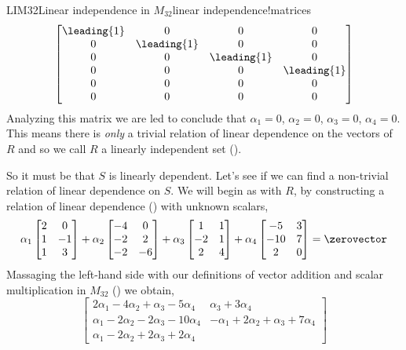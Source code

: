 \begin{example}{LIM32}{Linear independence in $M_{32}$}{linear independence!matrices}
\begin{equation*}
\begin{bmatrix}
\leading{1} & 0 & 0 & 0\\ 
0 & \leading{1} & 0 & 0\\ 
0 & 0 & \leading{1} & 0\\ 
0 & 0 & 0 & \leading{1}\\ 
0 & 0 & 0 & 0\\
0 & 0 & 0 & 0
\end{bmatrix}
\end{equation*}
%
Analyzing this matrix we are led to conclude that $\alpha_1=0$, $\alpha_2=0$, $\alpha_3=0$, $\alpha_4=0$.  This means there is {\em only} a trivial relation of linear dependence on the vectors of $R$ and so we call $R$ a linearly independent set ().\par
%
So it must be that $S$ is linearly dependent.  Let's see if we can find a non-trivial relation of linear dependence on $S$.  We will begin as with $R$, by constructing a relation of linear dependence () with unknown scalars,
%
\begin{equation*}
\alpha_1\begin{bmatrix}
2 & 0\\ 1 & -1\\ 1 & 3
\end{bmatrix}+
\alpha_2\begin{bmatrix}
-4 & 0\\ -2 & 2\\ -2 & -6
\end{bmatrix}+
\alpha_3\begin{bmatrix}
1 & 1\\ -2 & 1\\ 2 & 4
\end{bmatrix}+
\alpha_4\begin{bmatrix}
-5 & 3\\ -10 & 7\\ 2 & 0
\end{bmatrix}=
\zerovector
\end{equation*}
%
Massaging the left-hand side with our definitions of vector addition and scalar multiplication in $M_{32}$ () we obtain,
%
\begin{equation*}
\begin{bmatrix}
2\alpha_1-4\alpha_2+\alpha_3-5\alpha_4&
                              \alpha_3+3\alpha_4\\
\alpha_1-2\alpha_2-2\alpha_3-10\alpha_4&
-\alpha_1+2\alpha_2+\alpha_3+7\alpha_4\\ 
\alpha_1-2\alpha_2+2\alpha_3+2\alpha_4& 

\end{bmatrix}
\end{equation*}
\end{example}
